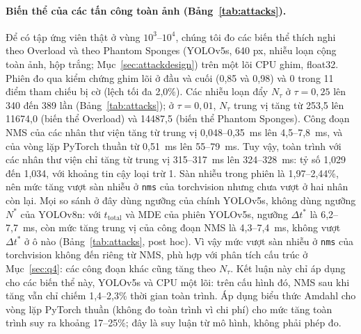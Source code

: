 \documentclass[a4paper,fleqn]{cas-dc}
\newcommand{\Ntau}{N_{\tau}}
\begin{document}
\paragraph{Biến thể của các tấn công toàn ảnh (Bảng~\ref{tab:attacks}).}
\label{sec:attacks}
Để có tập ứng viên thật ở vùng $10^3$--$10^4$, chúng tôi đo các biến thể thích nghi theo Overload và theo Phantom Sponges (YOLOv5s, 640 px, nhiễu loạn cộng toàn ảnh, hộp trắng; Mục~\ref{sec:attackdesign}) trên một lõi CPU ghim, float32. Phiên đo qua kiểm chứng ghim lõi ở đầu và cuối (0,85 và 0,98) và 0 trong 11 điểm tham chiếu bị cờ (lệch tối đa 2,0\%). Các nhiễu loạn đẩy $\Ntau$ ở $\tau=0{,}25$ lên 340 đến 389 lần (Bảng~\ref{tab:attacks}); ở $\tau=0{,}01$, $\Ntau$ trung vị tăng từ 253,5 lên 11674,0 (biến thể Overload) và 14487,5 (biến thể Phantom Sponges). Công đoạn NMS của các nhân thư viện tăng từ trung vị 0,048--0,35~ms lên 4,5--7,8~ms, và của vòng lặp PyTorch thuần từ 0,51~ms lên 55--79~ms. Tuy vậy, toàn trình với các nhân thư viện chỉ tăng từ trung vị 315--317~ms lên 324--328~ms: tỷ số 1,029 đến 1,034, với khoảng tin cậy loại trừ 1. Sàn nhiễu trong phiên là 1,97--2,44\%, nên mức tăng vượt sàn nhiễu ở \texttt{nms} của torchvision nhưng chưa vượt ở hai nhân còn lại. Mọi so sánh ở đây dùng ngưỡng của chính YOLOv5s, không dùng ngưỡng $N^{*}$ của YOLOv8n: với $t_{\mathrm{total}}$ và MDE của phiên YOLOv5s, ngưỡng $\Delta t^{*}$ là 6,2--7,7~ms, còn mức tăng trung vị của công đoạn NMS là 4,3--7,4~ms, không vượt $\Delta t^{*}$ ở ô nào (Bảng~\ref{tab:attacks}, post hoc). Vì vậy mức vượt sàn nhiễu ở \texttt{nms} của torchvision không đến riêng từ NMS, phù hợp với phân tích cấu trúc ở Mục~\ref{sec:q4}: các công đoạn khác cũng tăng theo $\Ntau$. Kết luận này chỉ áp dụng cho các biến thể này, YOLOv5s và CPU một lõi: trên cấu hình đó, NMS sau khi tăng vẫn chỉ chiếm 1,4--2,3\% thời gian toàn trình. Áp dụng biểu thức Amdahl cho vòng lặp PyTorch thuần (không đo toàn trình vì chi phí) cho mức tăng toàn trình suy ra khoảng 17--25\%; đây là suy luận từ mô hình, không phải phép đo.
\end{document}
